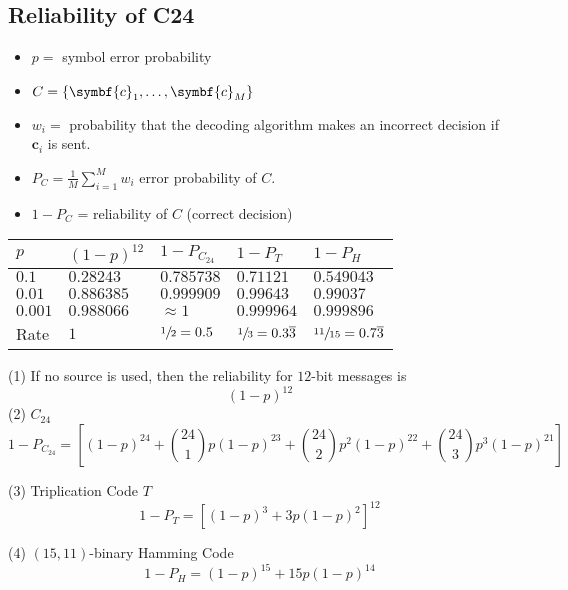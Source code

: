 \subsection*{Reliability of C24}
\begin{itemize}
    \item $ p = $ symbol error probability
    \item $ C=\set{\symbf{c}_1,\ldots ,\symbf{c}_M} $
    \item $ w_i = $ probability that the decoding algorithm makes an incorrect
          decision if $ \symbf{c}_i $ is sent.
    \item $ P_C=\frac{1}{M} \sum\limits_{i=1}^{M} w_i $ error probability of $ C $.
    \item $ 1-P_C $ = reliability of $ C $ (correct decision)
\end{itemize}

\begin{table}[H]
    \centering
    \begin{tabularx}{\linewidth}{@{}YYYYY@{}}
        $ p $     & $ (1-p)^{12} $ & $ 1-P_{C_{24}} $     & $ 1-P_T $                        & $ 1-P_H $                          \\
        \midrule
        $ 0.1 $   & $ 0.28243 $    & $ 0.785738      $    & $ 0.71121      $                 & $ 0.549043       $                 \\
        $ 0.01 $  & $ 0.886385 $   & $ 0.999909      $    & $ 0.99643      $                 & $ 0.99037       $                  \\
        $ 0.001 $ & $ 0.988066 $   & $ \approx 1    $     & $ 0.999964     $                 & $ 0.999896        $                \\
        Rate      & $ 1        $   & $ \sfrac{1}{2}=0.5 $ & $ \sfrac{1}{3}=0.3\overline{3} $ & $ \sfrac{11}{15}= 0.7\overline{3}$ \\
    \end{tabularx}
\end{table}


(1) If no source is used, then the reliability for $ 12 $-bit messages is
\[ (1-p)^{12} \]
(2) $ C_{24} $
\[ 1-P_{C_{24}}=\left[ (1-p)^{24}+\binom{24}{1}p(1-p)^{23}+\binom{24}{2}p^2(1-p)^{22}
        + \binom{24}{3}p^3 (1-p)^{21} \right] \]

(3) Triplication Code $ T $
\[ 1-P_T=\left[ (1-p)^3+3p(1-p)^2 \right]^{12} \]

(4) $ (15,11) $-binary Hamming Code
\[ 1-P_H=(1-p)^{15}+15p(1-p)^{14} \]
